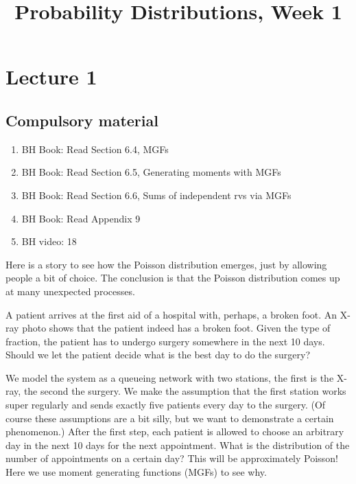 


\title{Probability Distributions, Week 1}


\maketitle

\toccontents

\section{Lecture 1}


\subsection{Compulsory material}

\begin{enumerate}
\item BH Book: Read Section 6.4, MGFs
\item BH Book: Read Section 6.5, Generating moments with MGFs
\item BH Book: Read Section 6.6, Sums of independent rvs via MGFs
\item BH Book: Read Appendix 9
\item BH video: 18
\end{enumerate}


Here is a story to see how the Poisson distribution emerges, just by allowing people a bit of choice.
The conclusion is that the Poisson distribution comes up at many unexpected processes.

A patient arrives at the first aid of a hospital with, perhaps, a broken foot.
An X-ray photo shows that the patient indeed has a broken foot.
Given the type of fraction, the patient has to undergo surgery somewhere in the next 10 days.
Should we let the patient decide what is the best day to do the surgery?

We model the system as a queueing network with two stations, the first is the X-ray, the second the surgery.
We make the assumption that the first station works super regularly and sends exactly five patients every day to the surgery.
(Of course these assumptions are a bit silly, but we want to demonstrate a certain phenomenon.)
After the first step, each patient is allowed to choose an arbitrary day in the next 10 days for the next appointment.
What is the distribution of the number of appointments on a certain day?
This will be approximately Poisson!
Here we use moment generating functions (MGFs) to see why.

